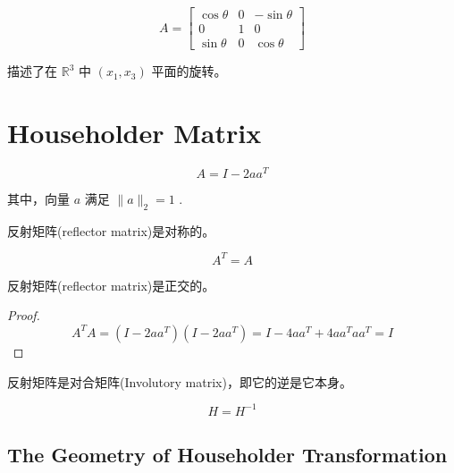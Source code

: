 \begin{example}
    $$ A=\left[\begin{array}{ccc}\cos \theta & 0 & -\sin \theta \\ 0 & 1 & 0 \\ \sin \theta & 0 & \cos \theta\end{array}\right] $$

    描述了在 $ \mathbb{R}^{3} $ 中 $ \left(x_{1}, x_{3}\right) $ 平面的旋转。
\end{example}

\section{Householder Matrix}

\begin{definition}
    $$
A=I-2 a a^{T}
$$

其中，向量 $ a $ 满足 $ \|a\|_{2}=1 $ .
\end{definition}

\begin{theorem}
    反射矩阵(reflector matrix)是对称的。

    $$A^T=A$$
\end{theorem}

\begin{theorem}
    反射矩阵(reflector matrix)是正交的。

\end{theorem}

\begin{proof}
    $$ A^{T} A=\left(I-2 a a^{T}\right)\left(I-2 a a^{T}\right)=I-4 a a^{T}+4 a a^{T} a a^{T}=I $$
\end{proof}

\begin{theorem}
    反射矩阵是对合矩阵(Involutory matrix)，即它的逆是它本身。

    $$H =  H^{-1}$$
\end{theorem}

\subsection{The Geometry of Householder Transformation}

